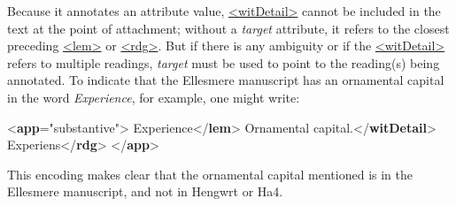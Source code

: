 Because it annotates an attribute value, \hyperref[TEI.witDetail]{<witDetail>} cannot be included in the text at the point of attachment; without a {\itshape target} attribute, it refers to the closest preceding \hyperref[TEI.lem]{<lem>} or \hyperref[TEI.rdg]{<rdg>}. But if there is any ambiguity or if the \hyperref[TEI.witDetail]{<witDetail>} refers to multiple readings, {\itshape target} must be used to point to the reading(s) being annotated. To indicate that the Ellesmere manuscript has an ornamental capital in the word \textit{Experience}, for example, one might write: \par\bgroup{}\exampleFont \begin{shaded}\noindent\mbox{}{<\textbf{app}\hspace*{1em}{type}="{substantive}">}\mbox{}\newline 
{}Experience{</\textbf{lem}>}\mbox{}\newline 
{}Ornamental capital.{</\textbf{witDetail}>}\mbox{}\newline 
{}Experiens{</\textbf{rdg}>}\mbox{}\newline 
{</\textbf{app}>}\end{shaded}\egroup\par \noindent  This encoding makes clear that the ornamental capital mentioned is in the Ellesmere manuscript, and not in Hengwrt or Ha4.\par
